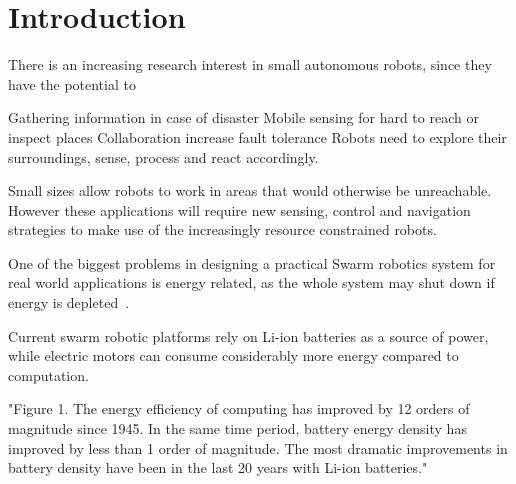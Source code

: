 \chapter{Introduction}
\label{chp:introduction}









There is an increasing research interest in small autonomous robots, since they have the potential to 



Gathering information in case of disaster
Mobile sensing for hard to reach or inspect places
Collaboration increase fault tolerance
Robots need to explore their surroundings, sense, process and react accordingly.

Small sizes allow robots to work in areas that would otherwise be unreachable. 
However these applications will require new sensing, control and navigation strategies to make use of the increasingly resource constrained robots.
	

One of the biggest problems in designing a practical Swarm robotics system for real world applications is energy related, as the whole system may shut down if energy is depleted~\cite{barca_sekercioglu_2013}.

Current swarm robotic platforms rely on Li-ion batteries as a source of power, while electric motors can consume considerably more energy compared to computation. %

"Figure 1. The energy efficiency of computing has improved by 12 orders of magnitude since 1945. In the same time period, battery energy density has improved by less than 1 order of magnitude. The most dramatic improvements in battery density have been in the last 20 years with Li-ion batteries."
\cite{patel_pvc_2017}


